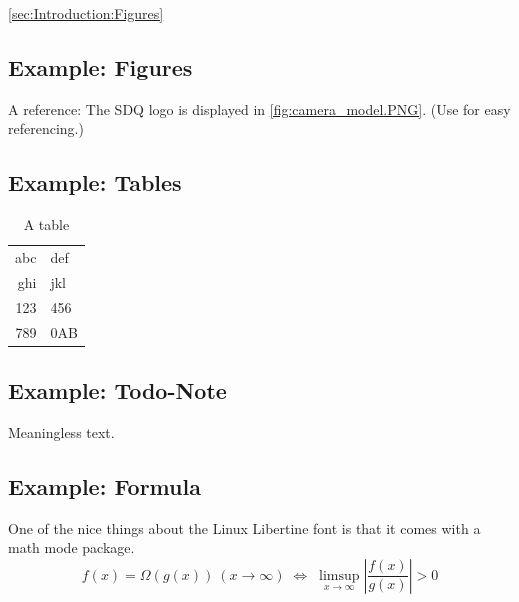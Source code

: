 \label{sec:Introduction:Citation}
\cite{1400121}  \autoref{sec:Introduction:Figures}

\subsection{Example: Figures}
\label{sec:Introduction:Figures}


A reference: The SDQ logo is displayed in \autoref{fig:camera_model.PNG}. 
(Use  for easy referencing.) 

\subsection{Example: Tables}
\label{sec:Introduction:Tables}
\begin{table}
\centering
\begin{tabular}{r l}
\toprule
abc & def\\
ghi & jkl\\
\midrule
123 & 456\\
789 & 0AB\\
\bottomrule
\end{tabular}
\caption{A table}
\label{tab:atable}
\end{table}

\subsection{Example: Todo-Note}
Meaningless text.

\subsection{Example: Formula}
One of the nice things about the Linux Libertine font is that it comes with
a math mode package.
\begin{displaymath}
f(x)=\Omega(g(x))\ (x\rightarrow\infty)\;\Leftrightarrow\;
\limsup_{x \to \infty} \left|\frac{f(x)}{g(x)}\right|> 0
\end{displaymath}

